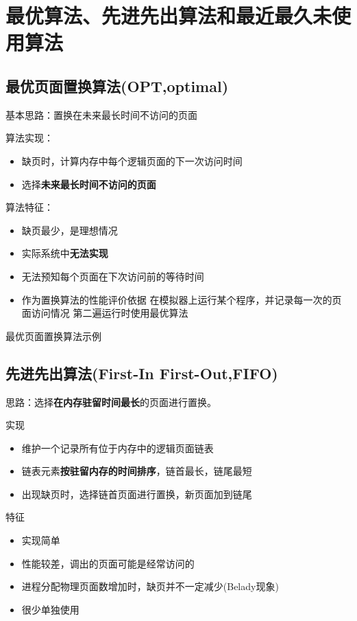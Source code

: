 \section{最优算法、先进先出算法和最近最久未使用算法}
\subsection{最优页面置换算法(OPT,optimal)}
基本思路：置换在未来最长时间不访问的页面\par 
算法实现：
\begin{itemize}
	\item 缺页时，计算内存中每个逻辑页面的下一次访问时间
	\item 选择\textbf{未来最长时间不访问的页面}
\end{itemize}
算法特征：
\begin{itemize}
	\item 缺页最少，是理想情况
	\item 实际系统中\textbf{无法实现}
	\item 无法预知每个页面在下次访问前的等待时间
	\item 作为置换算法的性能评价依据
	\subitem 在模拟器上运行某个程序，并记录每一次的页面访问情况
	\subitem 第二遍运行时使用最优算法
\end{itemize}
最优页面置换算法示例
\subsection{先进先出算法(First-In First-Out,FIFO)}
思路：选择\textbf{在内存驻留时间最长}的页面进行置换。
\par 实现
\begin{itemize}
	\item 维护一个记录所有位于内存中的逻辑页面链表
	\item 链表元素\textbf{按驻留内存的时间排序}，链首最长，链尾最短
	\item 出现缺页时，选择链首页面进行置换，新页面加到链尾
\end{itemize}
特征
\begin{itemize}
	\item 实现简单
	\item 性能较差，调出的页面可能是经常访问的
	\item 进程分配物理页面数增加时，缺页并不一定减少(Belady现象)
	\item 很少单独使用
\end{itemize}
